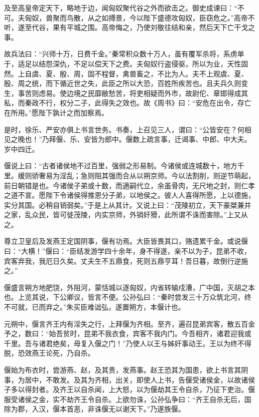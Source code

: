 \documentclass[]{article}
\begin{document}
及至高皇帝定天下，略地于边，闻匈奴聚代谷之外而欲击之。御史成谏曰：``不可。夫匈奴，兽聚而鸟散，从之如搏景，今以陛下盛德攻匈奴，臣窃危之。''高帝不听，遂至代谷，果有平城之围。高帝悔之，乃使刘敬往结和亲，然后天下亡干戈之事。

故兵法曰：``兴师十万，日费千金。''秦常积众数十万人，虽有覆军杀将，系虏单于，适足以结怨深仇，不足以偿天下之费。夫匈奴行盗侵驱，所以为业，天性固然。上自虞、夏、殷、周，固不程督，禽兽畜之，不比为人。夫不上观虞、夏、殷、周之统，而下循近世之失，此臣之所以大恐，百姓所疾苦也。且夫兵久则变生，事苦则虑易。使边境之民靡敝愁苦，将吏相疑而外市，故尉佗、章邯得成其私，而秦政不行，权分二子，此得失之效也。故《周书》曰：``安危在出令，存亡在所用。''愿陛下孰计之而加察焉。

是时，徐乐、严安亦俱上书言世务。书奏，上召见三人，谓曰：``公皆安在？何相见之晚也！''乃拜偃、乐、安皆为郎中。偃数上疏言事，迁谒事、中郎、中大夫。岁中四迁。

偃说上曰：``古者诸侯地不过百里，强弱之形易制。今诸侯或连城数十，地方千里。缓则骄奢易为淫乱；急则阻其强而合从以朔京师。今以法割削，则逆节萌起，前日朝错是也。今诸侯子弟或十数，而適嗣代立，余虽骨肉，无尺地之封，则仁孝之道不宣。愿陛下令诸侯得推恩分子弟，以地侯之。彼人人喜得所愿，上以德施，实分其国。必稍自销弱矣。''于是上从其计。又说上曰：``茂陵初立，天下豪桀兼并之家，乱众民，皆可徙茂陵，内实京师，外销奸猾，此所谓不诛而害除。''上又从之。

尊立卫皇后及发燕王定国阴事，偃有功焉。大臣皆畏其口，赂遗累千金。或说偃曰：``大横！''偃曰：``臣结发游学四十余年，身不得遂，亲不以为子，昆弟不收，宾客弃我，我厄日久矣。丈夫生不五鼎食，死则五鼎亨耳！吾日暮，故倒行逆施之。''

偃盛言朔方地肥饶，外阻河，蒙恬城以逐匈奴，内省转输戍漕，广中国，灭胡之本也。上览其说，下公卿议，皆言不便。公孙弘曰：``秦时尝发三十万众筑北河，终不可就，已而弃之。''朱买臣难诎弘，遂置朔方，本偃计也。

元朔中，偃言齐王内有淫失之行，上拜偃为齐相。至齐，遍召昆弟宾客，散五百金予之，数曰：``始吾贫时，昆弟不我衣食，宾客不我内门。今吾相齐，诸君迎我或千里。吾与诸君绝矣，毋复入偃之门！''乃使人以王与姊奸事动王。王以为终不得脱，恐效燕王论死，乃自杀。

偃始为布衣时，尝游燕、赵，及其贵，发燕事。赵王恐其为国患，欲上书言其阴事，为居中，不敢发。及其为齐相，出关，即使人上书，告偃受诸侯金，以故诸侯子多以得封者。及齐王以自杀闻，上大怒，以为偃劫其王令自杀，乃征下吏治。偃服受诸侯之金，实不劫齐王令自杀。上欲勿诛，公孙弘争曰：``齐王自杀无后，国除为郡，入汉，偃本首恶，非诛偃无以谢天下。''乃遂族偃。
\end{document}

